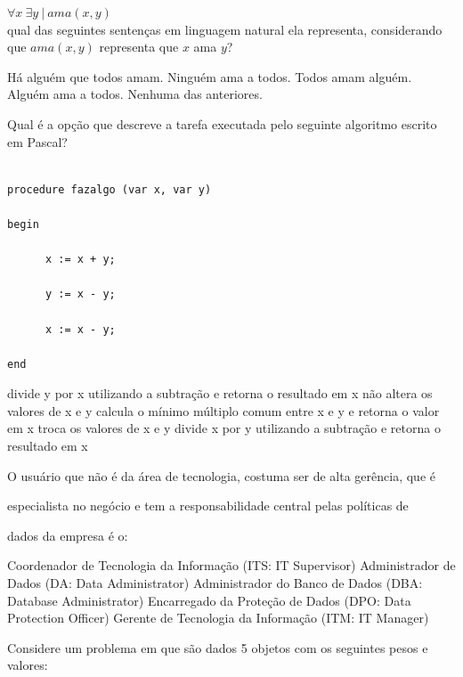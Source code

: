 \documentclass[12pt, addpoints]{exam}
\begin{document}
\begin{questions}
$\forall x \ \exists y \ | \ ama(x,y)$ \\

qual das seguintes sentenças em linguagem natural ela representa, considerando que \( ama(x,y) \) representa que \( x \) ama \( y \)?


\begin{choices}
\choice Há alguém que todos amam.
\choice Ninguém ama a todos.
\choice Todos amam alguém.
\choice Alguém ama a todos.
\choice Nenhuma das anteriores.
\end{choices}

\question

Qual é a opção que descreve a tarefa executada pelo seguinte algoritmo escrito em Pascal? 

\begin{verbatim} 

procedure fazalgo (var x, var y)

begin 

	  x := x + y; 

	  y := x - y;

	  x := x - y; 

end 

\end{verbatim}
\begin{choices}
\choice divide y por x utilizando a subtração e retorna o resultado em x
\choice não altera os valores de x e y
\choice calcula o mínimo múltiplo comum entre x e y e retorna o valor em x
\choice troca os valores de x e y
\choice divide x por y utilizando a subtração e retorna o resultado em x
\end{choices}

\question

O usuário que não é da área de tecnologia, costuma ser de alta gerência, que é

especialista no negócio e tem a responsabilidade central pelas políticas de

dados da empresa é o:
\begin{choices}
\choice Coordenador de Tecnologia da Informação (ITS: IT Supervisor)
\choice Administrador de Dados (DA: Data Administrator)
\choice Administrador do Banco de Dados (DBA: Database Administrator)
\choice Encarregado da Proteção de Dados (DPO: Data Protection Officer)
\choice Gerente de Tecnologia da Informação (ITM: IT Manager)
\end{choices}

\question

Considere um problema em que são dados 5 objetos com os seguintes pesos e valores:\\


\end{questions}
\end{document}
